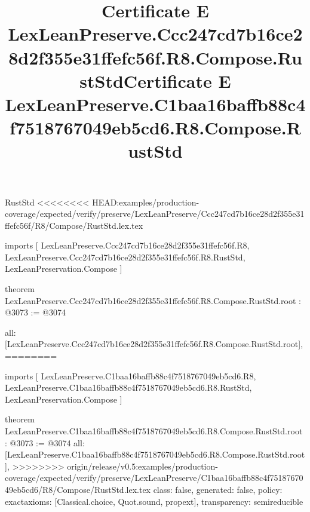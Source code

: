 \begin{lexlean}{RustStd}
<<<<<<<< HEAD:examples/production-coverage/expected/verify/preserve/LexLeanPreserve/Ccc247cd7b16ce28d2f355e31ffefc56f/R8/Compose/RustStd.lex.tex
\title{Certificate E LexLeanPreserve.Ccc247cd7b16ce28d2f355e31ffefc56f.R8.Compose.RustStd}
\begin{coremodule}
imports [
  LexLeanPreserve.Ccc247cd7b16ce28d2f355e31ffefc56f.R8,
  LexLeanPreserve.Ccc247cd7b16ce28d2f355e31ffefc56f.R8.RustStd,
  LexLeanPreservation.Compose
]

theorem LexLeanPreserve.Ccc247cd7b16ce28d2f355e31ffefc56f.R8.Compose.RustStd.root : @3073 := @3074 {
  all: [LexLeanPreserve.Ccc247cd7b16ce28d2f355e31ffefc56f.R8.Compose.RustStd.root],
========
\title{Certificate E LexLeanPreserve.C1baa16baffb88c4f7518767049eb5cd6.R8.Compose.RustStd}
\begin{coremodule}
imports [
  LexLeanPreserve.C1baa16baffb88c4f7518767049eb5cd6.R8,
  LexLeanPreserve.C1baa16baffb88c4f7518767049eb5cd6.R8.RustStd,
  LexLeanPreservation.Compose
]

theorem LexLeanPreserve.C1baa16baffb88c4f7518767049eb5cd6.R8.Compose.RustStd.root : @3073 := @3074 {
  all: [LexLeanPreserve.C1baa16baffb88c4f7518767049eb5cd6.R8.Compose.RustStd.root],
>>>>>>>> origin/release/v0.5:examples/production-coverage/expected/verify/preserve/LexLeanPreserve/C1baa16baffb88c4f7518767049eb5cd6/R8/Compose/RustStd.lex.tex
  class: false,
  generated: false,
  policy: exact{axioms: [Classical.choice, Quot.sound, propext]},
  transparency: semireducible
}


\end{coremodule}}
\end{coremodule}
\end{lexlean}
